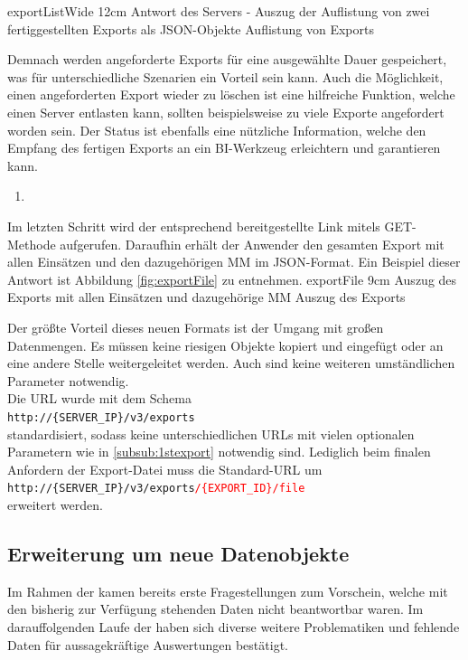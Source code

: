 \bild
{exportListWide}
{12cm}
{Antwort des Servers - Auszug der Auflistung von zwei fertiggestellten Exports als JSON-Objekte}
{Auflistung von Exports}

Demnach werden angeforderte Exports für eine ausgewählte Dauer gespeichert, was für unterschiedliche Szenarien ein Vorteil sein kann.
Auch die Möglichkeit, einen angeforderten Export wieder zu löschen ist eine hilfreiche Funktion, welche einen Server entlasten kann, sollten beispielsweise zu viele Exporte angefordert worden sein.
Der Status ist ebenfalls eine nützliche Information, welche den Empfang des fertigen Exports an ein \gls{BI}-Werkzeug erleichtern und garantieren kann.

\begin{enumerate}[resume]
\item {}
\end{enumerate}

Im letzten Schritt wird der entsprechend bereitgestellte Link mitels GET-Methode aufgerufen.
Daraufhin erhält der Anwender den gesamten Export mit allen Einsätzen und den dazugehörigen \gls{MM} im JSON-Format. 
Ein Beispiel dieser Antwort ist Abbildung \ref{fig:exportFile} zu entnehmen.
\bild
{exportFile}
{9cm}
{Auszug des Exports mit allen Einsätzen und dazugehörige \gls{MM}}
{Auszug des Exports}

Der größte Vorteil dieses neuen Formats ist der Umgang mit großen Datenmengen.
Es müssen keine riesigen Objekte kopiert und eingefügt oder an eine andere Stelle weitergeleitet werden. 
Auch sind keine weiteren umständlichen Parameter notwendig. \\
Die URL wurde mit dem Schema \\
\colorbox[RGB]{240,240,240}{\texttt{http://\{SERVER\_IP\}/v3/exports}} \\
standardisiert, sodass keine unterschiedlichen URLs mit vielen optionalen Parametern wie in \ref{subsub:1stexport} notwendig sind.
Lediglich beim finalen Anfordern der Export-Datei muss die Standard-URL um \\
\colorbox[RGB]{240,240,240}{\texttt{http://\{SERVER\_IP\}/v3/exports\textcolor{red}{/\{EXPORT\_ID\}/file}}} \\
erweitert werden. 

\subsection{Erweiterung um neue Datenobjekte} %
\label{sub:erweiterung}
Im Rahmen der  kamen bereits erste Fragestellungen zum Vorschein, welche mit den bisherig zur Verfügung stehenden Daten nicht beantwortbar waren.
Im darauffolgenden Laufe der  haben sich diverse weitere Problematiken und fehlende Daten für aussagekräftige Auswertungen bestätigt.

